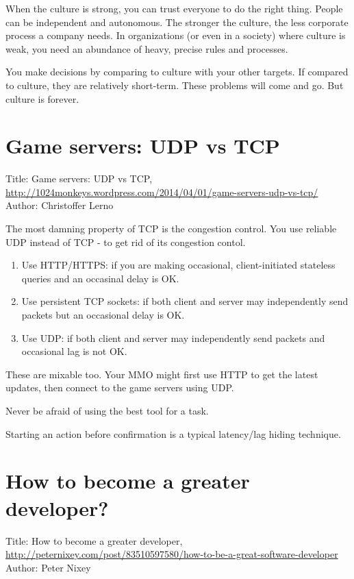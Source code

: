 When the culture is strong,
you can trust everyone to do the right thing.
People can be independent and autonomous.
The stronger the culture,
the less corporate process a company needs.
In organizations (or even in a society) where culture is weak,
you need an abundance of heavy, precise rules and processes.

You make decisions by comparing to culture with your other targets.
If compared to culture,
they are relatively short-term.
These problems will come and go.
But culture is forever.

\section{Game servers: UDP vs TCP}
Title: Game servers: UDP vs TCP, \url{http://1024monkeys.wordpress.com/2014/04/01/game-servers-udp-vs-tcp/}
\newline
Author: Christoffer Lerno \newline

The most damning property of TCP is the congestion control.
You use reliable UDP instead of TCP - to get rid of its congestion contol.

\begin{enumerate}
    \item Use HTTP/HTTPS: if you are making occasional, client-initiated stateless queries and an occasinal delay is OK.
    \item Use persistent TCP sockets: if both client and server may independently send packets but an occasional delay is OK.
    \item Use UDP: if both client and server may independently send packets and occasional lag is not OK.
\end{enumerate}

These are mixable too. Your MMO might first use HTTP to get the latest updates, then connect to the game servers using UDP.

Never be afraid of using the best tool for a task.

Starting an action before confirmation is a typical latency/lag hiding technique.


\section{How to become a greater developer?}
Title: How to become a greater developer,  \url{http://peternixey.com/post/83510597580/how-to-be-a-great-software-developer}\newline
Author: Peter Nixey \newline


